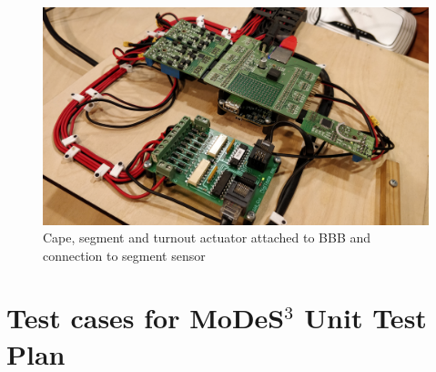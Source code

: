 \begin{figure}[H]
	\centering
	\includegraphics[width=150mm]{figures/modes3/segmentControlling.jpg}
	\caption{Cape, segment and turnout actuator attached to BBB and connection to segment sensor}
	\label{fig:BBBinAll}
\end{figure}
%
%
%


\section{Test cases for MoDeS$^3$ Unit Test Plan} \label{appendix:UnitTC}

